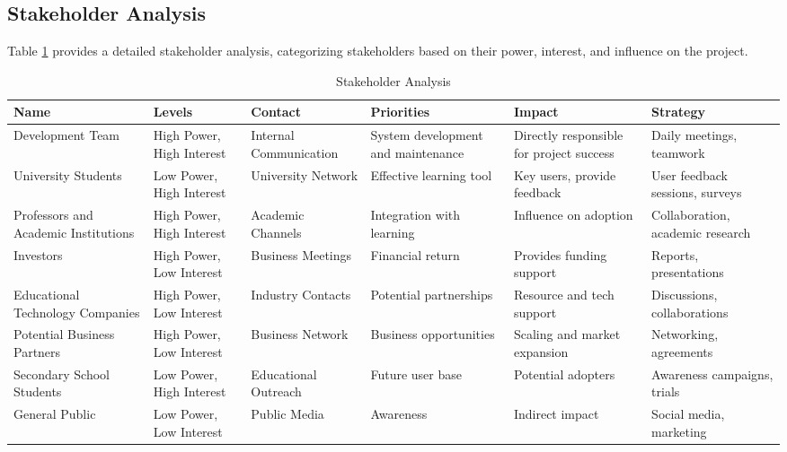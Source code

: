 \subsection{Stakeholder Analysis}
Table \ref{tab:stakeholder-analysis} provides a detailed stakeholder analysis, categorizing stakeholders based on their power, interest, and influence on the project.
\begin{table}[H]
    \centering
    \small
    \begin{tabularx}{\textwidth}{|>{\raggedright\arraybackslash}p{2.1cm}|>{\raggedright\arraybackslash}X|>{\raggedright\arraybackslash}X|>{\raggedright\arraybackslash}X|>{\raggedright\arraybackslash}X|>{\raggedright\arraybackslash}p{2.3cm}|}
        \rowcolor{gray!70}
        \hline
        \textbf{Name} & \textbf{Levels} & \textbf{Contact} & \textbf{Priorities} & \textbf{Impact} & \textbf{Strategy} \\ 
        \hline
        Development Team & High Power, High Interest & Internal Communication & System development and maintenance & Directly responsible for project success & Daily meetings, teamwork \\ 
        \hline
        University Students & Low Power, High Interest & University Network & Effective learning tool & Key users, provide feedback & User feedback sessions, surveys \\ 
        \hline
        Professors and Academic Institutions & High Power, High Interest & Academic Channels & Integration with learning & Influence on adoption & Collaboration, academic research \\ 
        \hline
        Investors & High Power, Low Interest & Business Meetings & Financial return & Provides funding support & Reports, presentations \\ 
        \hline
        Educational Technology Companies & High Power, Low Interest & Industry Contacts & Potential partnerships & Resource and tech support & Discussions, collaborations \\ 
        \hline
        Potential Business Partners & High Power, Low Interest & Business Network & Business opportunities & Scaling and market expansion & Networking, agreements \\ 
        \hline
        Secondary School Students & Low Power, High Interest & Educational Outreach & Future user base & Potential adopters & Awareness campaigns, trials \\ 
        \hline
        General Public & Low Power, Low Interest & Public Media & Awareness & Indirect impact & Social media, marketing \\ 
        \hline
    \end{tabularx}
    \caption{Stakeholder Analysis}
    \label{tab:stakeholder-analysis}
\end{table}


